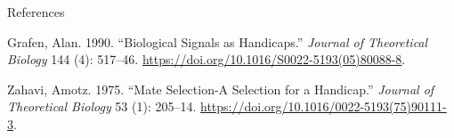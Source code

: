 \documentclass[
  ignorenonframetext,
  aspectratio=169]{beamer}
\newlength{\cslhangindent}
\newlength{\cslentryspacingunit} %
\newenvironment{CSLReferences}[2] %
 {%
  \setlength{\parindent}{0pt}
  \ifodd #1
  \let\oldpar\par
  \def\par{\hangindent=\cslhangindent\oldpar}
  \fi
  \setlength{\parskip}{#2\cslentryspacingunit}
 }%
 {}
\begin{document}
\begin{frame}{References}
\protect\hypertarget{references}{}
\hypertarget{refs}{}
\begin{CSLReferences}{1}{0}
\leavevmode{}%
Grafen, Alan. 1990. {``Biological Signals as Handicaps.''} \emph{Journal
of Theoretical Biology} 144 (4): 517--46.
\url{https://doi.org/10.1016/S0022-5193(05)80088-8}.

\leavevmode{}%
Zahavi, Amotz. 1975. {``Mate Selection\textemdash -{A} Selection for a
Handicap.''} \emph{Journal of Theoretical Biology} 53 (1): 205--14.
\url{https://doi.org/10.1016/0022-5193(75)90111-3}.

\end{CSLReferences}
\end{frame}
\end{document}
